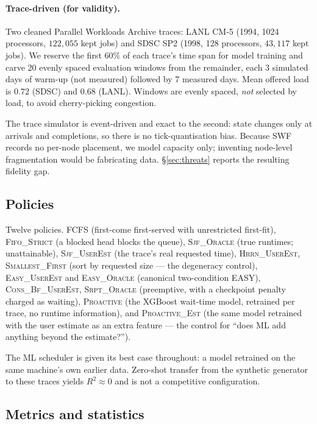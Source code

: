 \documentclass[11pt,twocolumn]{article}
\begin{document}
\paragraph{Trace-driven (for validity).}
Two cleaned Parallel Workloads Archive traces: LANL CM-5 (1994, 1024
processors, $122{,}055$ kept jobs) and SDSC SP2 (1998, 128 processors,
$43{,}117$ kept jobs). We reserve the first $60\%$ of each trace's time span for
model training and carve 20 evenly spaced evaluation windows from the remainder,
each 3 simulated days of warm-up (not measured) followed by 7 measured days.
Mean offered load is $0.72$ (SDSC) and $0.68$ (LANL). Windows are evenly spaced,
\emph{not} selected by load, to avoid cherry-picking congestion.

The trace simulator is event-driven and exact to the second: state changes only
at arrivals and completions, so there is no tick-quantisation bias. Because SWF
records no per-node placement, we model capacity only; inventing node-level
fragmentation would be fabricating data. \S\ref{sec:threats} reports the
resulting fidelity gap.

\subsection{Policies}

Twelve policies. \textsc{FCFS} (first-come first-served with unrestricted
first-fit), \textsc{Fifo\_Strict} (a blocked head blocks the queue),
\textsc{Sjf\_Oracle} (true runtimes; unattainable), \textsc{Sjf\_UserEst} (the
trace's real requested time), \textsc{Hrrn\_UserEst}, \textsc{Smallest\_First}
(sort by requested size --- the degeneracy control), \textsc{Easy\_UserEst} and
\textsc{Easy\_Oracle} (canonical two-condition EASY),
\textsc{Cons\_Bf\_UserEst}, \textsc{Srpt\_Oracle} (preemptive, with a
checkpoint penalty charged as waiting), \textsc{Proactive} (the XGBoost
wait-time model, retrained per trace, no runtime information), and
\textsc{Proactive\_Est} (the same model retrained with the user estimate as an
extra feature --- the control for ``does ML add anything beyond the estimate?'').

The ML scheduler is given its best case throughout: a model retrained on the
same machine's own earlier data. Zero-shot transfer from the synthetic generator
to these traces yields $R^2 \approx 0$ and is not a competitive configuration.

\subsection{Metrics and statistics}
\end{document}
